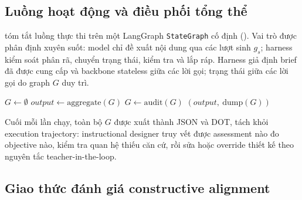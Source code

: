 \subsection{Luồng hoạt động và điều phối tổng thể}
\label{sec:orchestration}

 tóm tắt luồng thực thi trên một LangGraph
\texttt{StateGraph} cố định (). Vai trò được phân định
xuyên suốt: model chỉ đề xuất nội dung qua các lượt sinh $g_s$; harness kiểm
soát phân rã, chuyển trạng thái, kiểm tra và lắp ráp. Harness giả định brief đã
được cung cấp và backbone stateless giữa các lời gọi; trạng thái giữa các lời
gọi do graph $G$ duy trì.

\begin{algorithm}[t]
  \caption{Luồng thực thi của AlignmentGraph-ISD}
  \label{alg:harness}
  $G \leftarrow \emptyset$\;
  $output \leftarrow \mathrm{aggregate}(G)$\;
  $G \leftarrow \mathrm{audit}(G)$\;
  \Return $(output,\ \mathrm{dump}(G))$\;
\end{algorithm}

Cuối mỗi lần chạy, toàn bộ $G$ được xuất thành JSON và DOT, tách khỏi execution
trajectory: instructional designer truy vết được assessment nào đo objective
nào, kiểm tra quan hệ thiếu căn cứ, rồi sửa hoặc override thiết kế theo nguyên
tắc teacher-in-the-loop.

\subsection{Giao thức đánh giá constructive alignment}
\label{sec:protocol}


